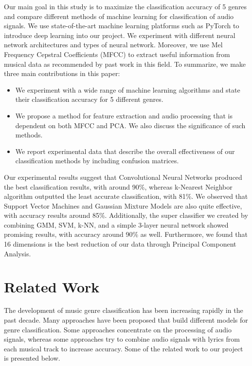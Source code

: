Our main goal in this study is to maximize the classification accuracy of 5 genres and compare different methods of machine learning for classification of audio signals. We use state-of-the-art machine learning platforms such as PyTorch \cite{PyTorch:2017} to introduce deep learning into our project. We experiment with different neural network architectures and types of neural network. Moreover, we use Mel Frequency Cepstral Coefficients (MFCC) \cite{MFCC:2011} to extract useful information from musical data as recommended by past work in this field.
To summarize, we make three main contributions in this paper:
\begin{itemize}
  \item We experiment with a wide range of machine learning algorithms and state their classification accuracy for 5 different genres. 
  \item We propose a method for feature extraction and audio processing that is dependent on both MFCC and PCA. We also discuss the significance of such methods. 
  \item We report experimental data that describe the overall effectiveness of our classification methods by including confusion matrices. 
\end{itemize}

Our experimental results suggest that Convolutional Neural Networks produced the best classification results, with around 90\%, whereas k-Nearest Neighbor algorithm outputted the least accurate classification, with 81\%. We observed that Support Vector Machines and Gaussian Mixture Models are also quite effective, with accuracy results around 85\%. Additionally, the super classifier we created by combining GMM, SVM, k-NN, and a simple 3-layer neural network showed promising results, with accuracy around 90\% as well. Furthermore, we found that 16 dimensions is the best reduction of our data through Principal Component Analysis. 

\section{Related Work}\label{sec:related}

The development of music genre classification has been increasing rapidly in the past decade. Many approaches have been proposed that build different models for genre classification. Some approaches concentrate on the processing of audio signals, whereas some approaches try to combine audio signals with lyrics from each musical track to increase accuracy. Some of the related work to our project is presented below. 

